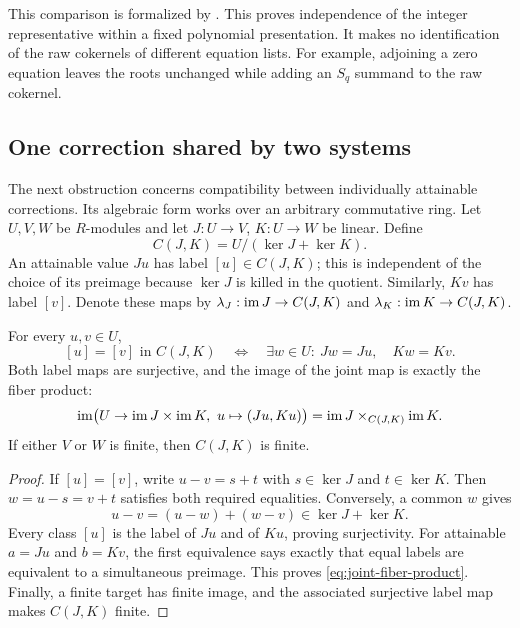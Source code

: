 This comparison is formalized by
.
This proves independence of the integer representative within a fixed
polynomial presentation. It makes no identification of the raw cokernels
of different equation lists. For example, adjoining a zero equation leaves
the roots unchanged while adding an $S_q$ summand to the raw cokernel.

\subsection{One correction shared by two systems}

The next obstruction concerns compatibility between individually attainable
corrections. Its algebraic form works over an arbitrary commutative ring.
Let $U,V,W$ be $R$-modules and let $J:U\to V$, $K:U\to W$ be linear.
Define
\begin{equation}\label{eq:common-quotient}
 C(J,K)=U/(\ker J+\ker K).
\end{equation}
An attainable value $Ju$ has label $[u]\in C(J,K)$; this is independent of
the choice of its preimage because $\ker J$ is killed in the quotient.
Similarly, $Kv$ has label $[v]$. Denote these maps by
$\lambda_J:\operatorname{im} J\to C(J,K)$ and $\lambda_K:\operatorname{im} K\to C(J,K)$.

\begin{theorem}\label{thm:common-correction}
For every $u,v\in U$,
\begin{equation}\label{eq:common-correction}
 [u]=[v]\text{ in }C(J,K)
 \quad\Longleftrightarrow\quad
 \exists w\in U:\ Jw=Ju,\quad Kw=Kv.
\end{equation}
Both label maps are surjective, and the image of the joint map is exactly
the fiber product:
\begin{equation}\label{eq:joint-fiber-product}
 \operatorname{im}\bigl(U\to\operatorname{im} J\times\operatorname{im} K,\ u\mapsto(Ju,Ku)\bigr)
 =\operatorname{im} J\mathbin{\times}_{C(J,K)}\operatorname{im} K.
\end{equation}
If either $V$ or $W$ is finite, then $C(J,K)$ is finite.
\end{theorem}

\begin{proof}
If $[u]=[v]$, write $u-v=s+t$ with $s\in\ker J$ and $t\in\ker K$.
Then $w=u-s=v+t$ satisfies both required equalities. Conversely, a common
$w$ gives
\[
 u-v=(u-w)+(w-v)\in\ker J+\ker K.
\]
Every class $[u]$ is the label of $Ju$ and of $Ku$, proving surjectivity.
For attainable $a=Ju$ and $b=Kv$, the first equivalence says exactly that
equal labels are equivalent to a simultaneous preimage. This proves
\eqref{eq:joint-fiber-product}. Finally, a finite target has finite image,
and the associated surjective label map makes $C(J,K)$ finite.
\end{proof}

